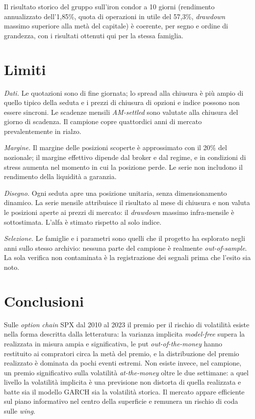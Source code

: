 \documentclass[11pt,a4paper]{article}
\begin{document}
Il risultato storico del gruppo sull'iron condor a 10 giorni (rendimento annualizzato dell'1{,}85\%, quota di operazioni in utile del 57{,}3\%, \emph{drawdown} massimo superiore alla metà del capitale) è coerente, per segno e ordine di grandezza, con i risultati ottenuti qui per la stessa famiglia.

\section{Limiti}\label{sec:limiti}

\emph{Dati.} Le quotazioni sono di fine giornata; lo spread alla chiusura è più ampio di quello tipico della seduta e i prezzi di chiusura di opzioni e indice possono non essere sincroni. Le scadenze mensili \emph{AM-settled} sono valutate alla chiusura del giorno di scadenza. Il campione copre quattordici anni di mercato prevalentemente in rialzo.

\emph{Margine.} Il margine delle posizioni scoperte è approssimato con il 20\% del nozionale; il margine effettivo dipende dal broker e dal regime, e in condizioni di stress aumenta nel momento in cui la posizione perde. Le serie non includono il rendimento della liquidità a garanzia.

\emph{Disegno.} Ogni seduta apre una posizione unitaria, senza dimensionamento dinamico. La serie mensile attribuisce il risultato al mese di chiusura e non valuta le posizioni aperte ai prezzi di mercato: il \emph{drawdown} massimo infra-mensile è sottostimata. L'alfa è stimato rispetto al solo indice.

\emph{Selezione.} Le famiglie e i parametri sono quelli che il progetto ha esplorato negli anni sullo stesso archivio: nessuna parte del campione è realmente \emph{out-of-sample}. La sola verifica non contaminata è la registrazione dei segnali prima che l'esito sia noto.

\section{Conclusioni}\label{sec:concl}

Sulle \emph{option chain} SPX dal 2010 al 2023 il premio per il rischio di volatilità esiste nella forma descritta dalla letteratura: la varianza implicita \emph{model-free} supera la realizzata in misura ampia e significativa, le put \emph{out-of-the-money} hanno restituito ai compratori circa la metà del premio, e la distribuzione del premio realizzato è dominata da pochi eventi estremi. Non esiste invece, nel campione, un premio significativo sulla volatilità \emph{at-the-money} oltre le due settimane: a quel livello la volatilità implicita è una previsione non distorta di quella realizzata e batte sia il modello GARCH sia la volatilità storica. Il mercato appare efficiente sul piano informativo nel centro della superficie e remunera un rischio di coda sulle \emph{wing}.
\end{document}
